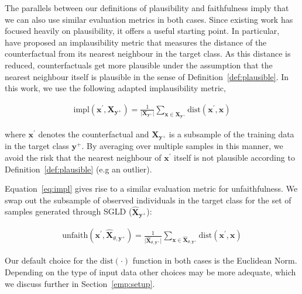 \documentclass[letterpaper]{article} %
\begin{document}
The parallels between our definitions of plausibility and faithfulness imply that we can also use similar evaluation metrics in both cases. Since existing work has focused heavily on plausibility, it offers a useful starting point. In particular,~\citet{guidotti2022counterfactual} have proposed an implausibility metric that measures the distance of the counterfactual from its nearest neighbour in the target class. As this distance is reduced, counterfactuals get more plausible under the assumption that the nearest neighbour itself is plausible in the sense of Definition~\ref{def:plausible}. In this work, we use the following adapted implausibility metric,

\begin{equation}\label{eq:impl}
  \begin{aligned}
    \text{impl}(\mathbf{x}^{\prime},\mathbf{X}_{\mathbf{y}^+}) = \frac{1}{\lvert\mathbf{X}_{\mathbf{y}^+}\rvert} \sum_{\mathbf{x} \in \mathbf{X}_{\mathbf{y}^+}} \text{dist}(\mathbf{x}^{\prime},\mathbf{x})
  \end{aligned}
\end{equation}

where $\mathbf{x}^{\prime}$ denotes the counterfactual and $\mathbf{X}_{\mathbf{y}^+}$ is a subsample of the training data in the target class $\mathbf{y}^+$. By averaging over multiple samples in this manner, we avoid the risk that the nearest neighbour of $\mathbf{x}^{\prime}$ itself is not plausible according to Definition~\ref{def:plausible} (e.g an outlier).

Equation~\ref{eq:impl} gives rise to a similar evaluation metric for unfaithfulness. We swap out the subsample of observed individuals in the target class for the set of samples generated through SGLD ($\widehat{\mathbf{X}}_{\mathbf{y}^+}$):

\begin{equation}\label{eq:faith}
  \begin{aligned}
    \text{unfaith}(\mathbf{x}^{\prime},\widehat{\mathbf{X}}_{\theta,\mathbf{y}^+}) = \frac{1}{\lvert \widehat{\mathbf{X}}_{\theta,\mathbf{y}^+} \rvert} \sum_{\mathbf{x} \in \widehat{\mathbf{X}}_{\theta,\mathbf{y}^+}} \text{dist}(\mathbf{x}^{\prime},\mathbf{x})
  \end{aligned}
\end{equation}

Our default choice for the $\text{dist}(\cdot)$ function in both cases is the Euclidean Norm. Depending on the type of input data other choices may be more adequate, which we discuss further in Section~\ref{emp:setup}. 
\end{document}
